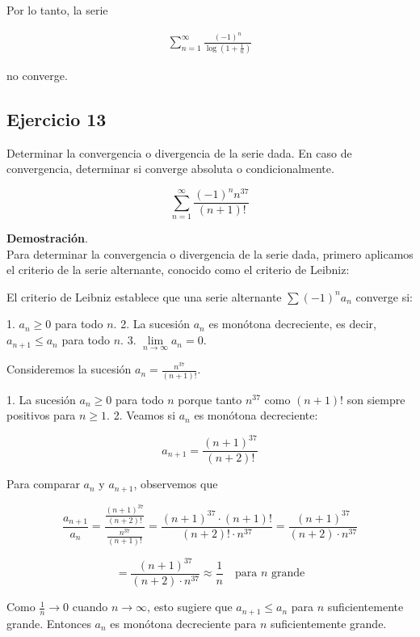 \documentclass{article}
\begin{document}
    Por lo tanto, la serie

    \begin{align*}
    \sum_{n=1}^{\infty} \frac{(-1)^{n}}{\log \left(1+\frac{1}{n}\right)}
    \end{align*}

    no converge.



    \subsection*{Ejercicio 13}

    Determinar la convergencia o divergencia de la serie dada. En caso de convergencia, determinar si converge absoluta o condicionalmente.

    $$
    \sum_{n=1}^{\infty} \frac{(-1)^{n} n^{37}}{(n+1)!}
    $$

    \textbf{Demostración}.\\

    Para determinar la convergencia o divergencia de la serie dada, primero aplicamos el criterio de la serie alternante, conocido como el criterio de Leibniz:

    El criterio de Leibniz establece que una serie alternante $\sum (-1)^n a_n$ converge si:

    1. $a_n \ge 0$ para todo $n$.
    2. La sucesión $a_n$ es monótona decreciente, es decir, $a_{n+1} \le a_n$ para todo $n$.
    3. $\lim\limits_{n \to \infty} a_n = 0$.

    Consideremos la sucesión $a_n = \frac{n^{37}}{(n+1)!}$.

    1. La sucesión $a_n \ge 0$ para todo $n$ porque tanto $n^{37}$ como $(n+1)!$ son siempre positivos para $n \ge 1$.
    2. Veamos si $a_n$ es monótona decreciente:

    \[
    a_{n+1} = \frac{(n+1)^{37}}{(n+2)!}
    \]

    Para comparar $a_n$ y $a_{n+1}$, observemos que

    \[
    \frac{a_{n+1}}{a_n} = \frac{\frac{(n+1)^{37}}{(n+2)!}}{\frac{n^{37}}{(n+1)!}} = \frac{(n+1)^{37} \cdot (n+1)!}{(n+2)! \cdot n^{37}} = \frac{(n+1)^{37}}{(n+2) \cdot n^{37}}
    \]

    \[
    = \frac{(n+1)^{37}}{(n+2) \cdot n^{37}} \approx \frac{1}{n} \quad \text{para $n$ grande}
    \]

    Como $\frac{1}{n} \to 0$ cuando $n \to \infty$, esto sugiere que $a_{n+1} \le a_n$ para $n$ suficientemente grande. Entonces $a_n$ es monótona decreciente para $n$ suficientemente grande.
\end{document}
